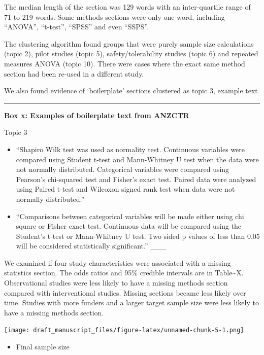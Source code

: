 \documentclass[
]{article}
\providecommand{\tightlist}{%
  \setlength{\itemsep}{0pt}\setlength{\parskip}{0pt}}
\begin{document}
The median length of the section was 129 words with an inter-quartile range of 71 to 219 words.
Some methods sections were only one word, including ``ANOVA'', ``t-test'', ``SPSS'' and even ``SSPS''.

The clustering algorithm found groups that were purely sample size calculations (topic 2), pilot studies (topic 5), safety/tolerability studies (topic 6) and repeated measures ANOVA (topic 10). There were cases where the exact same method section had been re-used in a different study.

We also found evidence of `boilerplate' sections clustered as topic 3, example text

\begin{center}\rule{0.5\linewidth}{0.5pt}\end{center}

\textbf{Box x: Examples of boilerplate text from ANZCTR}

Topic 3

\begin{itemize}
\tightlist
\item
  ``Shapiro Wilk test was used as normality test. Continuous variables were compared using Student t-test and Mann-Whitney U test when the data were not normally distributed. Categorical variables were compared using Pearson's chi-squared test and Fisher's exact test. Paired data were analyzed using Paired t-test and Wilcoxon signed rank test when data were not normally distributed.''
\item
  ``Comparisons between categorical variables will be made either using chi square or Fisher exact test. Continuous data will be compared using the Student's t-test or Mann-Whitney U test. Two sided p values of less than 0.05 will be considered statistically significant.''
  \_\_\_
\end{itemize}

We examined if four study characteristics were associated with a missing statistics section. The odds ratios and 95\% credible intervals are in Table\textasciitilde X. Observational studies were less likely to have a missing methods section compared with interventional studies. Missing sections became less likely over time. Studies with more funders and a larger target sample size were less likely to have a missing methods section.

\texttt{[image: draft\_manuscript\_files/figure-latex/unnamed-chunk-5-1.png]}

\begin{itemize}
\tightlist
\item
  Final sample size
\end{itemize}
\end{document}
